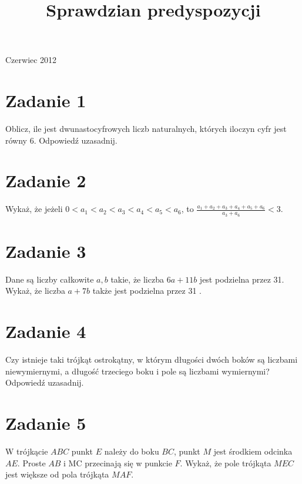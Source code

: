 \documentclass[10pt]{article}
\title{Sprawdzian predyspozycji }
\author{}
\date{}
\begin{document}
\maketitle
Czerwiec 2012

\section*{Zadanie 1}
Oblicz, ile jest dwunastocyfrowych liczb naturalnych, których iloczyn cyfr jest równy 6. Odpowiedź uzasadnij.

\section*{Zadanie 2}
Wykaż, że jeżeli \(0<a_{1}<a_{2}<a_{3}<a_{4}<a_{5}<a_{6}\), to \(\frac{a_{1}+a_{2}+a_{3}+a_{4}+a_{5}+a_{6}}{a_{3}+a_{6}}<3\).

\section*{Zadanie 3}
Dane są liczby całkowite \(a, b\) takie, że liczba \(6 a+11 b\) jest podzielna przez 31. Wykaż, że liczba \(a+7 b\) także jest podzielna przez 31 .

\section*{Zadanie 4}
Czy istnieje taki trójkąt ostrokątny, w którym długości dwóch boków są liczbami niewymiernymi, a długość trzeciego boku i pole są liczbami wymiernymi? Odpowiedź uzasadnij.

\section*{Zadanie 5}
W trójkącie \(A B C\) punkt \(E\) należy do boku \(B C\), punkt \(M\) jest środkiem odcinka \(A E\). Proste \(A B\) i MC przecinają się w punkcie \(F\). Wykaż, że pole trójkąta \(M E C\) jest większe od pola trójkąta \(M A F\).
\end{document}
